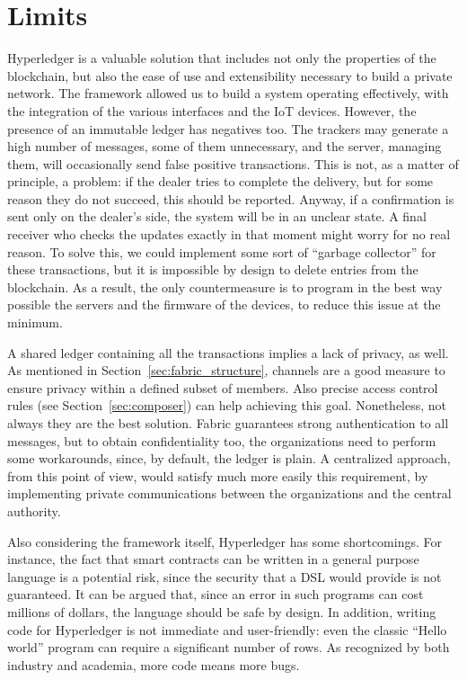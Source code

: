 \section{Limits}
Hyperledger is a valuable solution that includes not only the properties of the blockchain, but also the ease of use and extensibility necessary to build a private network. The framework allowed us to build a system operating effectively, with the integration of the various interfaces and the IoT devices. However, the presence of an immutable ledger has negatives too. The trackers may generate a high number of messages, some of them unnecessary, and the server, managing them, will occasionally send false positive transactions. This is not, as a matter of principle, a problem: if the dealer tries to complete the delivery, but for some reason they do not succeed, this should be reported. Anyway, if a confirmation is sent only on the dealer's side, the system will be in an unclear state. A final receiver who checks the updates exactly in that moment might worry for no real reason. To solve this, we could implement some sort of ``garbage collector'' for these transactions, but it is impossible by design to delete entries from the blockchain. As a result, the only countermeasure is to program in the best way possible the servers and the firmware of the devices, to reduce this issue at the minimum.

A shared ledger containing all the transactions implies a lack of privacy, as well. As mentioned in Section~\ref{sec:fabric_structure}, channels are a good measure to ensure privacy within a defined subset of members. Also precise access control rules (see Section~\ref{sec:composer}) can help achieving this goal. Nonetheless, not always they are the best solution. Fabric guarantees strong authentication to all messages, but to obtain confidentiality too, the organizations need to perform some workarounds, since, by default, the ledger is plain. A centralized approach, from this point of view, would satisfy much more easily this requirement, by implementing private communications between the organizations and the central authority.

Also considering the framework itself, Hyperledger has some shortcomings. For instance, the fact that smart contracts can be written in a general purpose language is a potential risk, since the security that a DSL would provide is not guaranteed. It can be argued that, since an error in such programs can cost millions of dollars, the language should be safe by design. In addition, writing code for Hyperledger is not immediate and user-friendly: even the classic ``Hello world'' program can require a significant number of rows. As recognized by both industry and academia, more code means more bugs.

